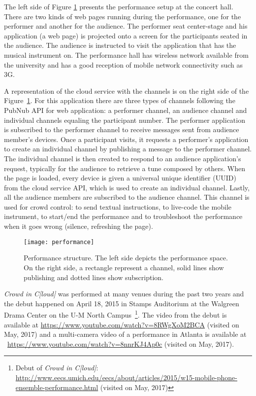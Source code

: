 The left side of Figure \ref{fig:performance} presents the performance setup at the concert hall.
There are two kinds of web pages running during the performance, one for the performer and another for the audience.
The performer seat center-stage and his application (a web page) is projected onto a screen for the participants seated in the audience.
The audience is instructed to visit the application that has the musical instrument on.
The performance hall has wireless network available from the university and has a good reception of mobile network connectivity such as 3G.

A representation of the cloud service with the channels is on the right side of the Figure~\ref{fig:performance}.
For this application there are three types of channels following the PubNub API for web application: a performer channel, an audience channel and individual channels equaling the participant number. 
The performer application is subscribed to the performer channel to receive messages sent from audience member's devices. 
Once a participant visits, it requests a performer's application to create an individual channel by publishing a message to the performer channel.
The individual channel is then created to respond to an audience application's request, typically for the audience to retrieve a tune composed by others.
When the page is loaded, every device is given a universal unique identifier (UUID) from the cloud service API, which is used to create an individual channel.
Lastly, all the audience members are subscribed to the audience channel. 
This channel is used for crowd control: to send textual instructions, to live-code the mobile instrument, to start/end the performance and to troubleshoot the performance when it goes wrong (silence, refreshing the page).

\begin{figure}[t]
	\centering
	\texttt{[image: performance]}
	\caption{Performance structure. The left side depicts the performance space. On the right side, a rectangle represent a channel, solid lines show publishing and dotted lines show subscription.}
	\label{fig:performance}
\end{figure}

\textit{Crowd in C[loud]} was performed at many venues during the past two years and the debut happened on April 18, 2015 in Stamps Auditorium at the Walgreen Drama Center on the U-M North Campus~\footnote{Debut of \textit{Crowd in C[loud]}: \url{http://www.eecs.umich.edu/eecs/about/articles/2015/w15-mobile-phone-ensemble-performance.html} (visited on May, 2017)}.
The video from the debut is available at \url{https://www.youtube.com/watch?v=8RWgXoM2BCA} (visited on May, 2017) and a multi-camera video of a performance in Atlanta is available at ~\url{https://www.youtube.com/watch?v=8nnrKJ4Ap0c} (visited on May, 2017).

